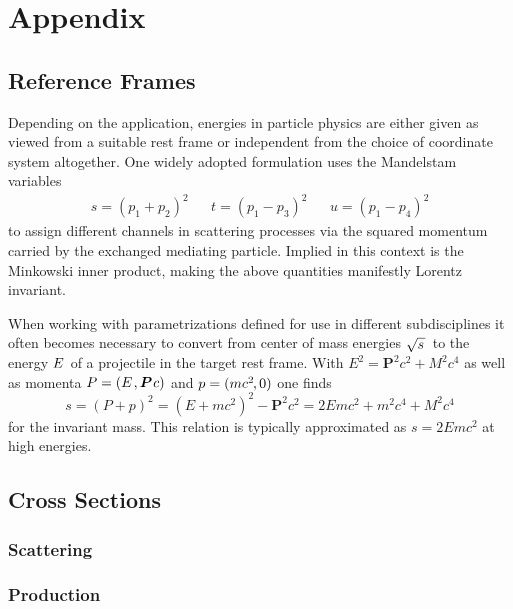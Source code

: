 \chapter*{Appendix}
\label{ch:appendix}

\section{Reference Frames}
\label{sec:frames}

Depending on the application, energies in particle physics are either given as viewed from a suitable rest frame or
independent from the choice of coordinate system altogether. One widely adopted formulation uses the Mandelstam variables
\begin{align*}
	s = (p_1 + p_2)^2 &&
	t = (p_1 - p_3)^2 &&
	u = (p_1 - p_4)^2
\end{align*}
to assign different channels in scattering processes via the squared momentum carried by the exchanged mediating particle.
Implied in this context is the Minkowski inner product, making the above quantities manifestly Lorentz invariant.

When working with parametrizations defined for use in different subdisciplines it often becomes necessary to convert from
center of mass energies $\sqrt{s \kern+1.0pt} \kern+1.0pt$ to the energy $\kern-0.5pt E \kern+1.0pt$ of a projectile in the target rest
frame. With $E^2 = \bm{P}^2 c^2 + M^2 c^4$ as well as momenta $P = (E \kern+1.0pt , \bm{P} \kern+0.75pt c)$ and
$p = (m c^2 \kern-1.0pt , 0)$ one finds
\begin{equation*}
	s = (P + p)^2 = (E + m c^2)^2 - \bm{P}^2 c^2 = 2E m c^2 + m^2 c^4 + M^2 c^4
\end{equation*}
for the invariant mass. This relation is typically approximated as $s = 2E m c^2$ at high energies.


\section{Cross Sections}
\label{sec:cross}

\subsection*{Scattering}

\subsection*{Production}

